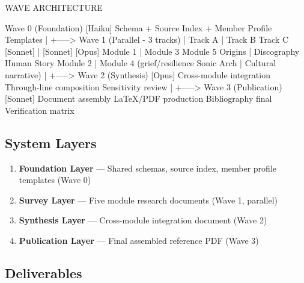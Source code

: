 \documentclass[11pt,letterpaper]{article}
\begin{document}
\begin{asciibox}
WAVE ARCHITECTURE

Wave 0 (Foundation)
  [Haiku] Schema + Source Index + Member Profile Templates
       |
       +-----> Wave 1 (Parallel - 3 tracks)
                |
      Track A   |   Track B        Track C
    [Sonnet]    |  [Sonnet]       [Opus]
    Module 1    |  Module 3       Module 5
    Origins     |  Discography    Human Story
    Module 2    |  Module 4       (grief/resilience
    Sonic Arch  |  Cultural       narrative)
                |
                +-----> Wave 2 (Synthesis)
                          [Opus]
                          Cross-module integration
                          Through-line composition
                          Sensitivity review
                          |
                          +-----> Wave 3 (Publication)
                                    [Sonnet]
                                    Document assembly
                                    LaTeX/PDF production
                                    Bibliography final
                                    Verification matrix
\end{asciibox}

\subsection{System Layers}

\begin{enumerate}[noitemsep]
  \item \textbf{Foundation Layer} --- Shared schemas, source index, member profile templates (Wave 0)
  \item \textbf{Survey Layer} --- Five module research documents (Wave 1, parallel)
  \item \textbf{Synthesis Layer} --- Cross-module integration document (Wave 2)
  \item \textbf{Publication Layer} --- Final assembled reference PDF (Wave 3)
\end{enumerate}

\subsection{Deliverables}
\end{document}

